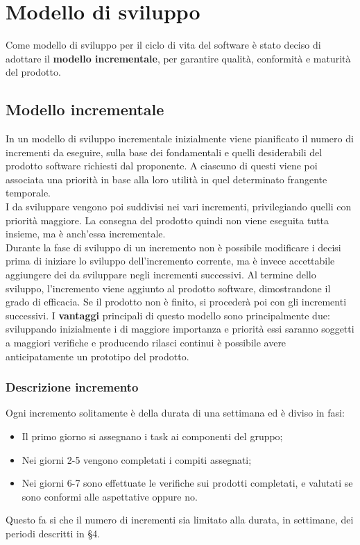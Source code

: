 \documentclass[PianoDiProgetto.tex]{subfiles}
\begin{document}
\chapter{Modello di sviluppo}
Come modello di sviluppo per il ciclo di vita del software è stato deciso di adottare il \textbf{modello incrementale}, per garantire qualità, conformità e maturità del prodotto.

\section{Modello incrementale}
In un modello di sviluppo incrementale inizialmente viene pianificato il numero di incrementi da eseguire, sulla base dei  fondamentali e quelli desiderabili del prodotto software richiesti dal proponente. A ciascuno di questi viene poi associata una priorità in base alla loro utilità in quel determinato frangente temporale.\\
I  da sviluppare vengono poi suddivisi nei vari incrementi, privilegiando quelli con priorità maggiore. La consegna del prodotto quindi non viene eseguita tutta insieme, ma è anch'essa incrementale.\\
Durante la fase di sviluppo di un incremento non è possibile modificare i  decisi prima di iniziare lo sviluppo dell'incremento corrente, ma è invece accettabile aggiungere dei  da sviluppare negli incrementi successivi. Al termine dello sviluppo, l'incremento viene aggiunto al prodotto software, dimostrandone il grado di efficacia. Se il prodotto non è finito, si procederà poi con gli incrementi successivi. I \textbf{vantaggi} principali di questo modello sono principalmente due: sviluppando inizialmente i  di maggiore importanza e priorità essi saranno soggetti a maggiori verifiche e producendo rilasci continui è possibile avere anticipatamente un prototipo del prodotto.

\subsection{Descrizione incremento}
Ogni incremento solitamente è della durata di una settimana ed è diviso in fasi:
\begin{itemize}
	\item Il primo giorno si assegnano i task ai componenti del gruppo;
	\item Nei giorni 2-5 vengono completati i compiti assegnati;
	\item Nei giorni 6-7 sono effettuate le verifiche sui prodotti completati, e valutati se sono conformi alle aspettative oppure no.
\end{itemize}
Questo fa si che il numero di incrementi sia limitato alla durata, in settimane, dei periodi descritti in \S 4.
\end{document}
